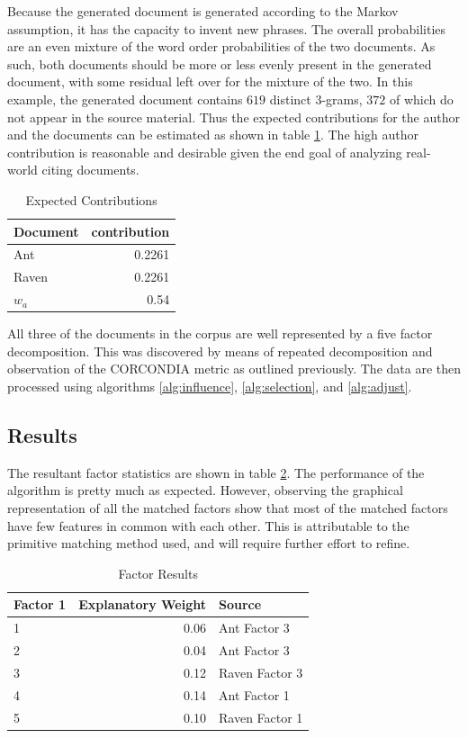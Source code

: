 \documentclass{article}
\begin{document}
Because the generated document is generated according to the Markov
assumption, it has the capacity to invent new phrases.  The overall
probabilities are an even mixture of the word order probabilities of
the two documents.  As such, both documents should be more or less
evenly present in the generated document, with some residual left over
for the mixture of the two.  In this example, the generated document
contains $619$ distinct 3-grams, $372$ of which do not appear in the
source material.  Thus the expected contributions for the author and
the documents can be estimated as shown in table \ref{tab:expected}. The
high author contribution is reasonable and desirable given the end
goal of analyzing real-world citing documents.

\begin{table}
    \begin{tabular}{l|r}
    {\bf Document} & {\bf contribution} \\
    \hline
    Ant &  0.2261 \\
    Raven & 0.2261 \\
    $w_a$ & 0.54 \\
    \end{tabular}
    \caption{Expected Contributions}
    \label{tab:expected}
\end{table}

All three of the documents in the corpus are well represented by
a five factor decomposition. This was discovered by means of repeated
decomposition and observation of the CORCONDIA metric as outlined
previously.  The data are then processed using algorithms
\ref{alg:influence}, \ref{alg:selection}, and \ref{alg:adjust}.

\subsection{Results}
The resultant factor statistics are shown in table \ref{tab:results}.  The
performance of the algorithm is pretty much as expected.  However,
observing the graphical representation of all the matched factors show
that most of the matched factors have few features in common with each
other.  This is attributable to the primitive matching method used,
and will require further effort to refine.

\begin{table}
    \begin{tabular}{l|r|l}
        {\bf Factor 1} & {\bf Explanatory Weight} & {Source}\\
        \hline
        1 & 0.06 & Ant Factor 3\\
        2 & 0.04 & Ant Factor 3\\
        3 & 0.12 & Raven Factor 3\\
        4 & 0.14 & Ant Factor 1\\
        5 & 0.10 & Raven Factor 1\\
    \end{tabular}
    \caption{Factor Results}
    \label{tab:results}
\end{table}
\end{document}
